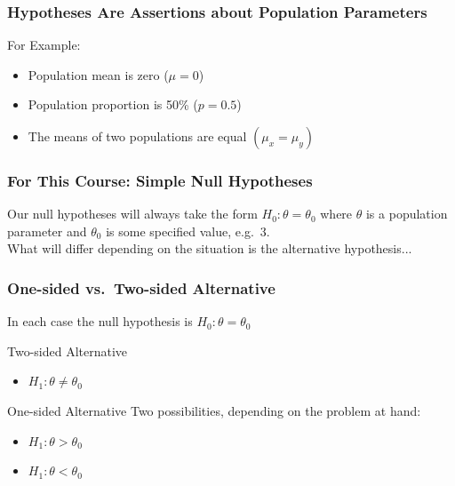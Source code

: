 \documentclass[handout]{beamer}
\begin{document}
\begin{frame}
\frametitle{Hypotheses Are Assertions about Population Parameters}
\begin{block}{For Example:}
	\begin{itemize}
		\item Population mean is zero ($\mu = 0$)
		\item Population proportion is 50\% ($p=0.5$) 
		\item The means of two populations are equal $(\mu_x = \mu_y)$ 
	\end{itemize}
	
	\end{block}
\end{frame}
\begin{frame}
\frametitle{For This Course: Simple Null Hypotheses}
	Our null hypotheses will always take the form $H_0\colon \theta = \theta_0$ where $\theta$ is a population parameter and $\theta_0$ is \alert{some specified value}, e.g.\ 3.\\ 
	 
	\vspace{2em}
	\alert{What will differ depending on the situation is the alternative hypothesis...}
\end{frame}


\begin{frame}
\frametitle{One-sided vs.\ Two-sided Alternative}
\alert{In each case the null hypothesis is $H_0\colon \theta = \theta_0$}
	\begin{block}{Two-sided Alternative}
		\begin{itemize}
			\item $H_1\colon \theta \neq \theta_0$
		\end{itemize}
\end{block}
	\begin{block}{One-sided Alternative}
		Two possibilities, depending on the problem at hand:
		\begin{itemize}
			\item $H_1\colon \theta > \theta_0$
			\item $H_1\colon \theta < \theta_0$
		\end{itemize}
\end{block}
\end{frame}
\end{document}

